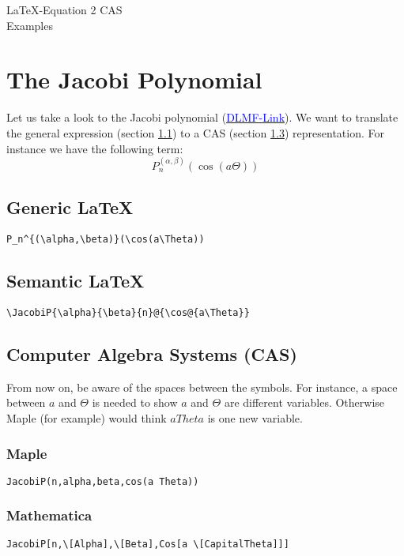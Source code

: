 \documentclass{article}
\begin{document}
\begin{center}
    \Large
    \LaTeX-Equation 2 CAS\\[12pt]
    \large Examples
\end{center}

\section{The Jacobi Polynomial}
Let us take a look to the Jacobi polynomial (\href{http://dlmf.nist.gov/18.3\#T1.t1.r2}{\textcolor{blue}{\underline{DLMF-Link}}}). We want to translate the general expression (section \ref{sec:generic}) to a CAS (section \ref{sec:cas}) representation. For instance we have the following term:
\begin{equation}\label{eq:jacP}
    P_n^{(\alpha, \beta)}(\cos(a \Theta))
\end{equation}

\subsection{Generic \LaTeX}\label{sec:generic}
\begin{lstlisting}[mathescape]
P_n^{(\alpha,\beta)}(\cos(a\Theta))
\end{lstlisting}

\subsection{Semantic \LaTeX}\label{sec:semantic}
\begin{lstlisting}[mathescape]
\JacobiP{\alpha}{\beta}{n}@{\cos@{a\Theta}}
\end{lstlisting}

\subsection{Computer Algebra Systems (CAS)}\label{sec:cas}
From now on, be aware of the spaces between the symbols. For instance, a space between $a$ and $\Theta$ is needed to show $a$ and $\Theta$ are different variables. Otherwise Maple (for example) would think $aTheta$ is one new variable.
\subsubsection{Maple}\label{subsec:maple}
\begin{lstlisting}[mathescape]
JacobiP(n,alpha,beta,cos(a Theta))
\end{lstlisting}

\subsubsection{Mathematica}\label{subsec:mathematica}
\begin{lstlisting}[mathescape]
JacobiP[n,\[Alpha],\[Beta],Cos[a \[CapitalTheta]]]
\end{lstlisting}
\end{document}
